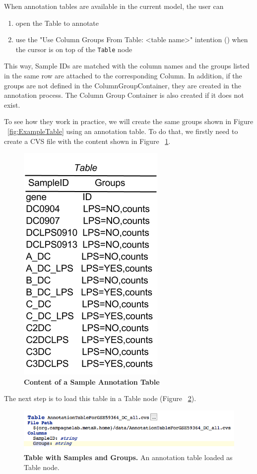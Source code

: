 When annotation tables are available in the current model, the user can
\begin{enumerate}
\item  open the Table to annotate 
\item use the "Use Column Groups From Table: <table name>" intention (\intentionLightBulb) when the cursor is on top of the \texttt{Table} node
\end{enumerate}
This way, Sample IDs are matched with the column names and the groups listed in the same row are attached to the corresponding Column. In addition, if the groups are not defined in the ColumnGroupContainer, they are created in the annotation process. The Column Group Container is also created if it does not exist.

To see how they work in practice, we will create the same groups shown in Figure ~\ref{fig:ExampleTable} using an annotation table. To do that, we firstly need to create a CVS file with the content shown in Figure ~\ref{fig:AnnotateTableSample}.

\begin{figure}[h!tbp]
  \centering
  \includegraphics[width=\figWidthNarrow]{figures/AnnotationTableSample.png}
\caption[Content of a Sample Annotation Table]{\textbf{Content of a Sample Annotation Table} }
\label{fig:AnnotateTableSample}
\end{figure}

The next step is to load this table in a Table node (Figure ~\ref{fig:NewAnnotationTable}).   
\begin{figure}[h!tbp]
  \centering
  \includegraphics[width=\figWidthWide]{figures/AnnotationTable.png}
\caption[Table with Samples and Groups]{\textbf{Table with Samples and Groups.} An annotation table loaded as Table node.}
\label{fig:NewAnnotationTable}
\end{figure}

